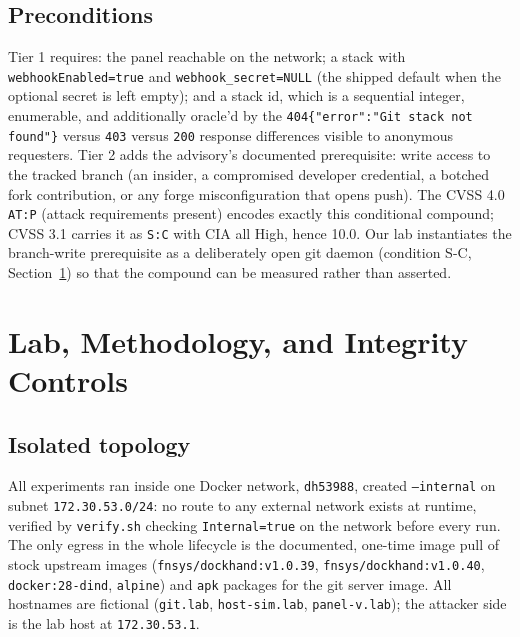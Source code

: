 \documentclass[journal]{IEEEtran}
\begin{document}
\subsection{Preconditions}
\label{sec:precond}

Tier 1 requires: the panel reachable on the network; a stack with
\texttt{webhookEnabled=true} and \texttt{webhook\_secret=NULL} (the shipped
default when the optional secret is left empty); and a stack id, which is a
sequential integer, enumerable, and additionally oracle'd by the
\texttt{404}\allowbreak\texttt{\{"error":"Git stack not found"\}} versus
\texttt{403} versus \texttt{200} response differences visible to anonymous
requesters. Tier 2 adds the advisory's documented prerequisite: write access
to the tracked branch (an insider, a compromised developer credential, a
botched fork contribution, or any forge misconfiguration that opens push).
The CVSS 4.0 \texttt{AT:P} (attack requirements present) encodes exactly this
conditional compound; CVSS 3.1 carries it as \texttt{S:C} with CIA all High,
hence 10.0. Our lab instantiates the branch-write prerequisite as a
deliberately open git daemon (condition S-C, Section~\ref{sec:lab}) so that
the compound can be measured rather than asserted.

\section{Lab, Methodology, and Integrity Controls}
\label{sec:lab}

\subsection{Isolated topology}

All experiments ran inside one Docker network, \texttt{dh53988}, created
\texttt{--internal} on subnet \texttt{172.30.53.0/24}: no route to any
external network exists at runtime, verified by \texttt{verify.sh} checking
\texttt{Internal=true} on the network before every run. The only egress in the
whole lifecycle is the documented, one-time image pull of stock upstream
images (\texttt{fnsys/dockhand:v1.0.39}, \texttt{fnsys/dockhand:v1.0.40},
\texttt{docker:28-dind}, \texttt{alpine}) and \texttt{apk} packages for the
git server image. All hostnames are fictional (\texttt{git.lab},
\texttt{host-sim.lab}, \texttt{panel-v.lab}); the attacker side is the lab
host at \texttt{172.30.53.1}.
\end{document}
